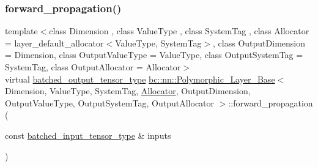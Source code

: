 \subsubsection{\texorpdfstring{forward\+\_\+propagation()}{forward\_propagation()}\hspace{0.1cm}{\footnotesize\ttfamily [2/2]}}
{\footnotesize\ttfamily template$<$class Dimension , class Value\+Type , class System\+Tag , class Allocator  = layer\+\_\+default\+\_\+allocator$<$\+Value\+Type, System\+Tag$>$, class Output\+Dimension  = Dimension, class Output\+Value\+Type  = Value\+Type, class Output\+System\+Tag  = System\+Tag, class Output\+Allocator  = Allocator$>$ \\
virtual \hyperlink{structbc_1_1nn_1_1Polymorphic__Layer__Base_a45ed57549be9c4e5c40c52168ca15ae9}{batched\+\_\+output\+\_\+tensor\+\_\+type} \hyperlink{structbc_1_1nn_1_1Polymorphic__Layer__Base}{bc\+::nn\+::\+Polymorphic\+\_\+\+Layer\+\_\+\+Base}$<$ Dimension, Value\+Type, System\+Tag, \hyperlink{classbc_1_1allocators_1_1Allocator}{Allocator}, Output\+Dimension, Output\+Value\+Type, Output\+System\+Tag, Output\+Allocator $>$\+::forward\+\_\+propagation (\begin{DoxyParamCaption}\item[{const \hyperlink{structbc_1_1nn_1_1Polymorphic__Layer__Base_ae694b03dd73923ff973b0d2c9156e161}{batched\+\_\+input\+\_\+tensor\+\_\+type} \&}]{inputs }\end{DoxyParamCaption})\hspace{0.3cm}{\ttfamily [pure virtual]}}

\mbox{\label{structbc_1_1nn_1_1Polymorphic__Layer__Base_a71ab20a7baff5faf1c3d5ff16552a983}} 
